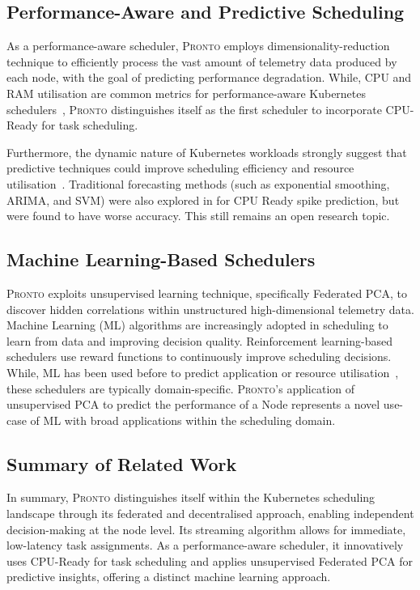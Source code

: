 \subsection{Performance-Aware and Predictive Scheduling}
As a performance-aware scheduler, \textsc{Pronto} employs
dimensionality-reduction technique to efficiently process the vast amount of
telemetry data produced by each node, with the goal of predicting performance
degradation. While, CPU and RAM utilisation are common metrics for
performance-aware Kubernetes schedulers~\cite{bao2019deep, beltre2019kubesphere,
bestari2020dynamic, carvalho2021qoe, toka2021ultra}, \textsc{Pronto}
distinguishes itself as the first scheduler to incorporate CPU-Ready for task
scheduling.

Furthermore, the dynamic nature of Kubernetes workloads strongly suggest that
predictive techniques could improve scheduling efficiency and resource
utilisation~\cite{carrion2022kubernetes}. Traditional forecasting methods (such as
exponential smoothing, ARIMA, and SVM) were also explored in
\cite{grammenos_pronto_2021} for CPU Ready spike prediction, but were found to
have worse accuracy. This still remains an open research topic.

\subsection{Machine Learning-Based Schedulers}
\textsc{Pronto} exploits unsupervised learning technique, specifically Federated
PCA, to discover hidden correlations within unstructured high-dimensional
telemetry data. Machine Learning (ML) algorithms  are increasingly adopted in
scheduling to learn from data and improving decision quality.
Reinforcement learning-based schedulers \cite{bao2019deep, huang2020rlsk,
peng2021dl2, han2021tailored} use reward functions to continuously improve
scheduling decisions. While, ML has been used before to predict application or
resource utilisation~\cite{yang2019design, carvalho2021qoe,
harichane2020proposal}, these schedulers are typically domain-specific.
\textsc{Pronto}'s application of unsupervised PCA to predict the performance
of a Node represents a novel use-case of ML with broad applications within the
scheduling domain.

\subsection{Summary of Related Work}
In summary, \textsc{Pronto} distinguishes itself within the Kubernetes
scheduling landscape through its federated and decentralised approach, enabling
independent decision-making at the node level. Its streaming algorithm allows
for immediate, low-latency task assignments. As a performance-aware scheduler, it
innovatively uses CPU-Ready for task scheduling and applies unsupervised
Federated PCA for predictive insights, offering a distinct machine learning
approach.

